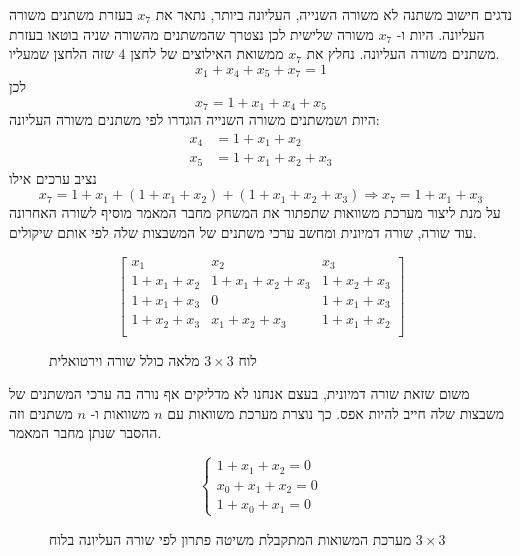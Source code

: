 \documentclass[12pt,leqno]{article}
\theoremstyle{theoremdd}
\begin{document}
נדגים חישוב
משתנה לא משורה השנייה,
העליונה ביותר,
נתאר את
$x_7$
בעזרת משתנים משורה העליונה.
היות ו-
$x_7$
משורה שלישית לכן נצטרך 
שהמשתנים מהשורה שניה בוטאו בעזרת משתנים משורה העליונה.
נחלץ את 
$x_7$
ממשואת האילוצים של לחצן
$4$
שזה הלחצן שמעליו.
\[ x_1 + x_4 + x_5 + x_7 = 1 \]
לכן 
\[ x_7 = 1 + x_1 + x_4 + x_5  \]
היות ושמשתנים משורה השנייה הוגדרו לפי משתנים 
משורה העליונה:
\begin{align*}
    x_4 &= 1 + x_1 + x_2 \\
    x_5 &= 1 + x_1 + x_2 + x_3
\end{align*}
נציב ערכים אילו
\begin{equation*}
    x_7 = 1 + x_1 + (1 + x_1 + x_2) + (1 + x_1 + x_2 + x_3) \Rightarrow
    x_7 = 1 + x_1 + x_3
\end{equation*}
על מנת ליצור מערכת משוואות
שתפתור את המשחק
מחבר המאמר
\cite{B1}
מוסיף לשורה האחרונה עוד שורה, שורה דמיונית ומחשב ערכי 
משתנים של המשבצות שלה לפי אותם שיקולים.
\begin{figure}[ht]
    \caption{לוח 
    $3 \times 3$
    מלאה
    כולל שורה וירטואלית
    }
    \label{fig: 3 x 3 board fill with virtual}
    \centering
    \[
        \begin{bmatrix}
            x_1 & x_2 & x_3 \\
            1 + x_1 + x_2 & 1 + x_1 + x_2 + x_3 & 1 + x_2 + x_3 \\
            1 + x_1 + x_3 & 0 & 1 + x_1 + x_3 \\
            \hline
            1 + x_2 + x_3 & x_1 + x_2 + x_3 & 1 + x_1 + x_2 \\
        \end{bmatrix}
    \]
\end{figure}
משום שזאת שורה דמיונית, 
בעצם אנחנו לא מדליקים אף נורה בה ערכי המשתנים של משבצות
שלה חייב להיות אפס.
כך נוצרת מערכת משוואות עם 
$n$
משוואות ו- 
$n$
משתנים וזה ההסבר שנתן מחבר המאמר.
\begin{figure}[ht]
    \caption{
        מערכת המשואות המתקבלת משיטה פתרון לפי שורה העליונה
        בלוח 
        $3 \times 3$
    }
    \label{fig: eq system for spanish method 3 x 3}
    
    \[\begin{cases}
        1+x_{1}+x_{2}=0\\
        x_0 + x_1 + x_2 = 0\\
        1 + x_0 + x_1 = 0
        \end{cases} \]
\end{figure}
\end{document}
